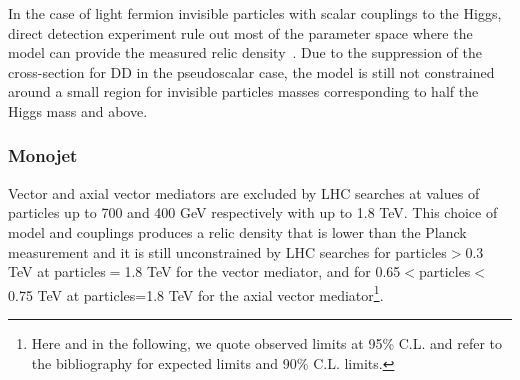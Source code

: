 In the case of light fermion invisible particles with scalar couplings to the Higgs, direct detection experiment rule out most of the parameter space where the model can provide the measured relic density~\cite{Escudero:2016gzx,Djouadi:2011aa}. Due to the suppression of the cross-section for DD in the pseudoscalar case, the model is still not constrained around a small region for invisible particles masses corresponding to half the Higgs mass and above. %

\subsubsection{Monojet}

Vector and axial vector mediators are excluded by LHC searches at values of \mdm particles up to 700 and 400 GeV respectively with \mmed up to 1.8 TeV. This choice of model and couplings produces a relic density that is lower than the Planck measurement and it is still unconstrained by LHC searches for \mdm particles$>$0.3 TeV at \mdm particles$=$1.8 TeV for the vector mediator, and for 0.65$<$\mdm particles$<$0.75 TeV at \mdm particles=1.8 TeV for the axial vector mediator\footnote{Here and in the following, we quote observed limits at 95\% C.L. and refer to the bibliography for expected limits and 90\% C.L. limits.}. 

